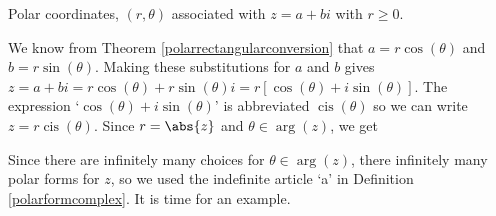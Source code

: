 \medskip

\noindent\begin{minipage}{\textwidth}
\begin{center}
\end{center}
\captionsetup{type=figure}
\caption{Polar coordinates, $(r, \theta)$ associated with $z = a+bi$ with $r \geq 0$.}\label{fig:polarcom2}
\end{minipage}

\medskip

We know from  Theorem \ref{polarrectangularconversion} that $a = r\cos(\theta)$ and $b = r\sin(\theta)$. Making these substitutions for $a$ and $b$ gives $z = a + bi = r\cos(\theta) + r \sin(\theta) i = r \left[\cos(\theta) + i \sin(\theta)\right]$. The expression `$\cos(\theta) + i\sin(\theta)$' is abbreviated $\operatorname{cis}(\theta)$ so we can write  $z = r\operatorname{cis}(\theta)$.	Since  $r = \abs{z}$ and $\theta \in \operatorname{arg}(z)$, we get

\medskip


\medskip										

Since there are infinitely many choices for $\theta \in \operatorname{arg}(z)$, there infinitely many polar forms for $z$, so we used the indefinite article `a' in Definition \ref{polarformcomplex}.  It is time for an example.

\medskip

